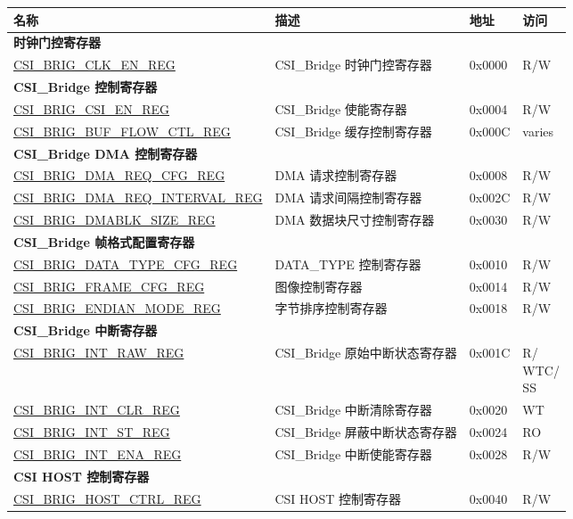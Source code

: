 \begin{longtable}{ | p{6cm} | p{7.2cm} | p{1.3cm} | p{1cm} | }
\hline\rowcolor{lightgray}
{\bfseries 名称} & {\bfseries 描述} &  {\bfseries 地址} & {\bfseries 访问} \\ \hline
\endhead
\multicolumn{4}{|l|}{\textbf{时钟门控寄存器}} \\ \hline
\hyperref[regdesc:CSIBRIGCLKENREG]{CSI\_BRIG\_CLK\_EN\_REG} & CSI\_Bridge 时钟门控寄存器 & 0x0000 & R/W \\ \hline
\multicolumn{4}{|l|}{\textbf{CSI\_Bridge 控制寄存器}} \\ \hline
\hyperref[regdesc:CSIBRIGCSIENREG]{CSI\_BRIG\_CSI\_EN\_REG} & CSI\_Bridge 使能寄存器 & 0x0004 & R/W \\ \hline
\hyperref[regdesc:CSIBRIGBUFFLOWCTLREG]{CSI\_BRIG\_BUF\_FLOW\_CTL\_REG} & CSI\_Bridge 缓存控制寄存器 & 0x000C & varies \\ \hline
\multicolumn{4}{|l|}{\textbf{CSI\_Bridge DMA 控制寄存器}} \\ \hline
\hyperref[regdesc:CSIBRIGDMAREQCFGREG]{CSI\_BRIG\_DMA\_REQ\_CFG\_REG} & DMA 请求控制寄存器 & 0x0008 & R/W \\ \hline
\hyperref[regdesc:CSIBRIGDMAREQINTERVALREG]{CSI\_BRIG\_DMA\_REQ\_INTERVAL\_REG} & DMA 请求间隔控制寄存器 & 0x002C & R/W \\ \hline
\hyperref[regdesc:CSIBRIGDMABLKSIZEREG]{CSI\_BRIG\_DMABLK\_SIZE\_REG} & DMA 数据块尺寸控制寄存器 & 0x0030 & R/W \\ \hline
\multicolumn{4}{|l|}{\textbf{CSI\_Bridge 帧格式配置寄存器}} \\ \hline
\hyperref[regdesc:CSIBRIGDATATYPECFGREG]{CSI\_BRIG\_DATA\_TYPE\_CFG\_REG} & DATA\_TYPE 控制寄存器 & 0x0010 & R/W \\ \hline
\hyperref[regdesc:CSIBRIGFRAMECFGREG]{CSI\_BRIG\_FRAME\_CFG\_REG} & 图像控制寄存器 & 0x0014 & R/W \\ \hline
\hyperref[regdesc:CSIBRIGENDIANMODEREG]{CSI\_BRIG\_ENDIAN\_MODE\_REG} & 字节排序控制寄存器 & 0x0018 & R/W \\ \hline
\multicolumn{4}{|l|}{\textbf{CSI\_Bridge 中断寄存器}} \\ \hline
\hyperref[regdesc:CSIBRIGINTRAWREG]{CSI\_BRIG\_INT\_RAW\_REG} & CSI\_Bridge 原始中断状态寄存器 & 0x001C & \makecell[l]{R/\\WTC/\\SS} \\ \hline
\hyperref[regdesc:CSIBRIGINTCLRREG]{CSI\_BRIG\_INT\_CLR\_REG} & CSI\_Bridge 中断清除寄存器 & 0x0020 & WT \\ \hline
\hyperref[regdesc:CSIBRIGINTSTREG]{CSI\_BRIG\_INT\_ST\_REG} & CSI\_Bridge 屏蔽中断状态寄存器 & 0x0024 & RO \\ \hline
\hyperref[regdesc:CSIBRIGINTENAREG]{CSI\_BRIG\_INT\_ENA\_REG} & CSI\_Bridge 中断使能寄存器 & 0x0028 & R/W \\ \hline
\multicolumn{4}{|l|}{\textbf{CSI HOST 控制寄存器}} \\ \hline
\hyperref[regdesc:CSIBRIGHOSTCTRLREG]{CSI\_BRIG\_HOST\_CTRL\_REG} & CSI HOST 控制寄存器 & 0x0040 & R/W \\ \hline
\end{longtable}
